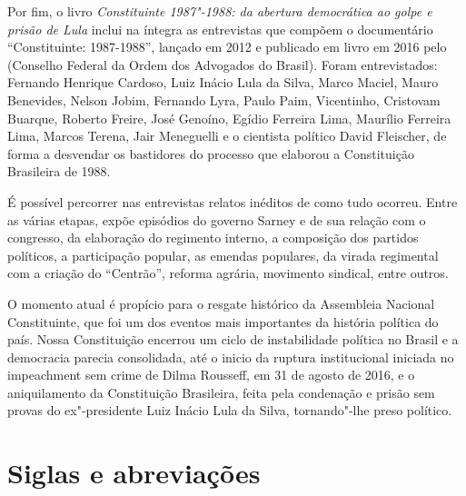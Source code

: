 Por fim, o livro \emph{Constituinte 1987"-1988: da abertura democrática
ao golpe e prisão de Lula} inclui na íntegra as entrevistas
que compõem o documentário “Constituinte: 1987-1988”, lançado em 2012 e
publicado em livro em 2016 pelo  (Conselho Federal da Ordem dos Advogados do
Brasil). Foram entrevistados: Fernando Henrique Cardoso, Luiz Inácio Lula da Silva, Marco
Maciel, Mauro Benevides, Nelson Jobim, Fernando Lyra, Paulo Paim, Vicentinho, Cristovam Buarque,
Roberto Freire, José Genoíno, Egídio Ferreira Lima, Maurílio Ferreira Lima, Marcos Terena, Jair
Meneguelli e o cientista político David Fleischer, de forma a desvendar os bastidores do
processo que elaborou a Constituição Brasileira de 1988.

É possível percorrer nas entrevistas relatos inéditos de como tudo ocorreu. Entre as várias
etapas, expõe episódios do governo Sarney e de sua relação com o congresso, da elaboração do
regimento interno, a composição dos partidos políticos, a participação popular, as emendas
populares, da virada regimental com a criação do “Centrão”, reforma agrária, movimento sindical,
entre outros.

O momento atual é propício para o resgate histórico da Assembleia Nacional Constituinte, que
foi um dos eventos mais importantes da história política do país. Nossa Constituição encerrou
um ciclo de instabilidade política no Brasil e a democracia parecia consolidada, até o inicio da
ruptura institucional iniciada no impeachment sem crime de Dilma Rousseff, em 31 de agosto de
2016, e o aniquilamento da Constituição Brasileira, feita pela condenação e prisão sem provas
do ex"-presidente Luiz Inácio Lula da Silva, tornando"-lhe preso político.

\section{Siglas e abreviações}

